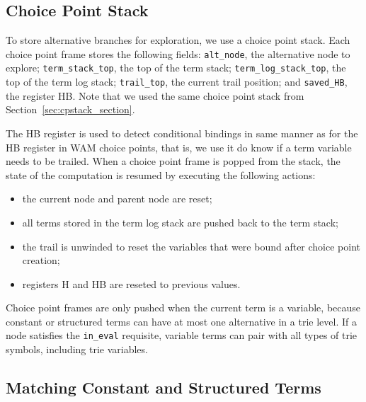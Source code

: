 \subsection{Choice Point Stack}

To store alternative branches for exploration, we use a choice point stack.
Each choice point frame
stores the following fields:
\texttt{alt\_node}, the alternative node to explore;
\texttt{term\_stack\_top}, the top of the term stack;
\texttt{term\_log\_stack\_top}, the top of the term log stack;
\texttt{trail\_top}, the current trail position;
and \texttt{saved\_HB}, the register HB. Note that we used the same choice point stack
from Section~\ref{sec:cpstack_section}.


The HB register is used to detect conditional bindings in same manner as for the HB register in
WAM choice points, that is, we use it do know if a term variable needs to be trailed.
When a choice point frame is popped from the stack, the state of the computation is resumed
by executing the following actions:

\begin{itemize}
  \item the current node and parent node are reset;
  \item all terms stored in the term log stack are pushed back to the term stack;
  \item the trail is unwinded to reset the variables that were bound after choice point creation;
  \item registers H and HB are reseted to previous values.
\end{itemize}

Choice point frames are only pushed when the current term is a variable, because constant or structured
terms can have at most one alternative in a trie level. If a node satisfies the \texttt{in\_eval} requisite,
variable terms can pair with all types of trie symbols, including trie variables.

\subsection{Matching Constant and Structured Terms}

